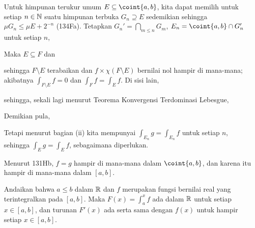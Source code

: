 {\medskip
     
 Untuk himpunan terukur umum $E\subseteq\coint{a,b}$,
kita dapat memilih untuk setiap $n\in\Bbb N$ suatu himpunan terbuka
$G_n\supseteq E$ sedemikian sehingga $\mu G_n\le\mu E+2^{-n}$ (134Fa).
Tetapkan $G_n'=\bigcap_{m\le n}G_m$,
$E_n=\coint{a,b}\cap G'_n$ untuk setiap $n$,
     
     
\noindent Maka $E\subseteq F$ dan
     
     
\noindent sehingga $F\setminus E$ terabaikan dan
$f\times\chi(F\setminus E)$ bernilai nol hampir di mana-mana; akibatnya
$\int_{F\setminus E}f=0$ dan $\int_Ff=\int_Ef$. Di sisi lain,
     
     
\noindent sehingga, sekali lagi menurut Teorema Konvergensi Terdominasi
Lebesgue,
     
     
\noindent Demikian pula,
     
     
\noindent Tetapi menurut bagian (ii) kita mempunyai
$\int_{E_n}g=\int_{E_n}f$ untuk setiap $n$, sehingga
$\int_Eg=\int_Ef$, sebagaimana diperlukan.\ \Qed
     
Menurut 131Hb, $f=g$ hampir di mana-mana dalam $\coint{a,b}$, dan
karena itu hampir di mana-mana dalam $[a,b]$.
}%
     
 Andaikan bahwa $a\le b$ dalam $\Bbb R$ dan $f$
merupakan fungsi bernilai real yang terintegralkan pada $[a,b]$. Maka
$F(x)=\int_a^xf$ ada dalam $\Bbb R$ untuk setiap $x\in[a,b]$, dan
turunan $F'(x)$ ada serta sama dengan $f(x)$ untuk hampir setiap
$x\in[a,b]$.
     
